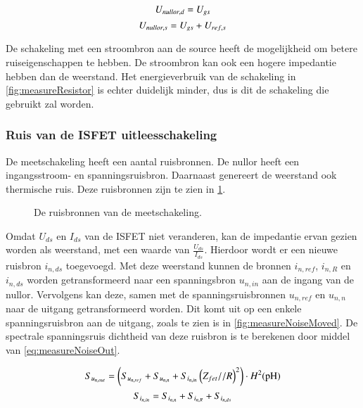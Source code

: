 \begin{equation}\label{eq:nullorVoltageDrain}
    U_{nullor,d} = U_{gs}
    \tagaddtext{[\si{\volt}]}
\end{equation}
\begin{equation}\label{eq:nullorVoltageSource}
    U_{nullor,s} = U_{gs} + U_{ref,s}
    \tagaddtext{[\si{\volt}]}
\end{equation}

De schakeling met een stroombron aan de source heeft de mogelijkheid om betere ruiseigenschappen te hebben. De stroombron kan ook een hogere impedantie hebben dan de weerstand. Het energieverbruik van de schakeling in \cref{fig:measureResistor} is echter duidelijk minder, dus is dit de schakeling die gebruikt zal worden.

\subsubsection{Ruis van de ISFET uitleesschakeling}

De meetschakeling heeft een aantal ruisbronnen. De nullor heeft een ingangsstroom- en spanningsruisbron. Daarnaast genereert de weerstand ook thermische ruis. Deze ruisbronnen zijn te zien in \cref{fig:measureNoise}.
\begin{figure}[!htb]
    \centering
    \def\svgwidth{0.6\textwidth}
    
    \caption{De ruisbronnen van de meetschakeling.}
    \label{fig:measureNoise}
\end{figure}


Omdat $U_{ds}$ en $I_{ds}$ van de ISFET niet veranderen, kan de impedantie ervan gezien worden als weerstand, met een waarde van $\frac{U_{ds}}{I_{ds}}$. Hierdoor wordt er een nieuwe ruisbron $i_{n,ds}$ toegevoegd. Met deze weerstand kunnen de bronnen $i_{n,ref}$, $i_{n,R}$ en $i_{n,ds}$ worden getransformeerd naar een spanningsbron $u_{n,in}$ aan de ingang van de nullor.
Vervolgens kan deze, samen met de spanningsruisbronnen $u_{n,ref}$ en $u_{n,n}$ naar de uitgang getransformeerd worden. Dit komt uit op een enkele spanningsruisbron aan de uitgang, zoals te zien is in \cref{fig:measureNoiseMoved}. De spectrale spanningsruis dichtheid van deze ruisbron is te berekenen door middel van \cref{eq:measureNoiseOut}.

\begin{equation}\label{eq:measureNoiseOut}
    S_{u_{{n,out}}} = \left(S_{u_{{n,ref}}} + S_{u_{{n,n}}} + S_{i_{n,in}}\left(Z_{fet} // R\right)^2\right) \cdot H^2(\ph)
    \tagaddtext{[\si{\volt\squared\per\hertz}]}
\end{equation}
\begin{equation}
    S_{i_{{n,in}}} = S_{i_{{n,n}}} + S_{i_{{n,R}}} + S_{i_{{n,ds}}}
    \tagaddtext{[\si{\ampere\squared\per\hertz}]}
    \label{eq:measureNoiseCurrentIn}
\end{equation}


